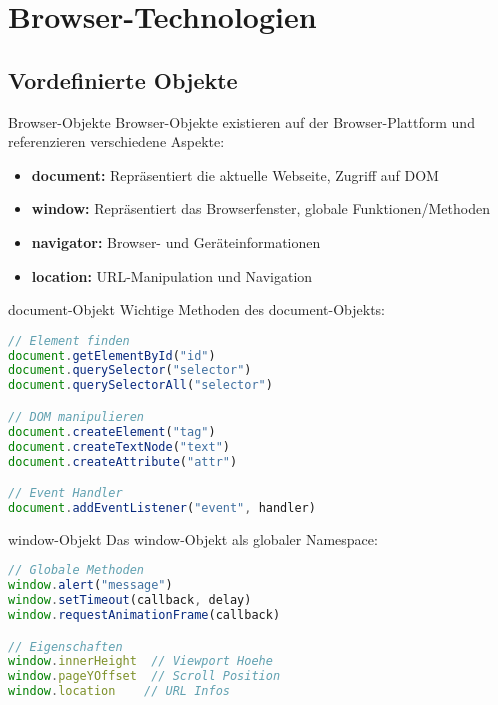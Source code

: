 \section{Browser-Technologien}

\subsection{Vordefinierte Objekte}
\begin{concept}{Browser-Objekte}
Browser-Objekte existieren auf der Browser-Plattform und referenzieren verschiedene Aspekte:
\begin{itemize}
  \item \textbf{document:} Repräsentiert die aktuelle Webseite, Zugriff auf DOM
  \item \textbf{window:} Repräsentiert das Browserfenster, globale Funktionen/Methoden  
  \item \textbf{navigator:} Browser- und Geräteinformationen
  \item \textbf{location:} URL-Manipulation und Navigation
\end{itemize}
\end{concept}

\begin{KR}{document-Objekt}
Wichtige Methoden des document-Objekts:
\begin{lstlisting}[language=JavaScript, style=basesmol]
// Element finden
document.getElementById("id")  
document.querySelector("selector") 
document.querySelectorAll("selector")

// DOM manipulieren
document.createElement("tag")    
document.createTextNode("text") 
document.createAttribute("attr")

// Event Handler
document.addEventListener("event", handler)
\end{lstlisting}
\end{KR}

\begin{KR}{window-Objekt}
Das window-Objekt als globaler Namespace:
\begin{lstlisting}[language=JavaScript, style=basesmol]
// Globale Methoden
window.alert("message")
window.setTimeout(callback, delay)
window.requestAnimationFrame(callback)

// Eigenschaften
window.innerHeight  // Viewport Hoehe
window.pageYOffset  // Scroll Position
window.location    // URL Infos
\end{lstlisting}
\end{KR}

